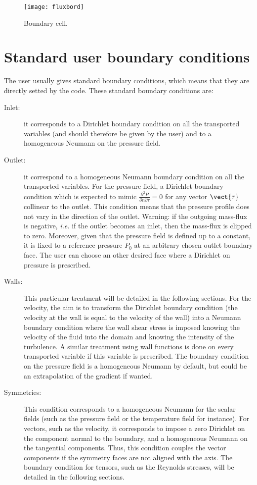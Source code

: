 \begin{figure}[!htpb]
\centering
\texttt{[image: fluxbord]}
\caption{Boundary cell.\label{fig:bndcnd:boundary_flux}}
\end{figure}

\section{Standard user boundary conditions}

The user usually gives standard boundary conditions, which means that 
they are directly setted by the code. These standard boundary conditions are:

\begin{description}
\item[Inlet:] it corresponds to a Dirichlet boundary condition on all the transported variables 
(and should therefore be given by the user) 
and to a homogeneous Neumann on the pressure field. 

\item[Outlet:] it correspond to a homogeneous Neumann boundary condition on all the transported variables.
For the pressure field, a Dirichlet boundary condition which is expected to mimic $\displaystyle\frac{\partial^2 P}{\partial n \partial \tau}=0$ for any vector  $\vect{\tau}$ collinear to the outlet. This condition means that the pressure
profile does not vary in the direction of the outlet. Warning: if the outgoing mass-flux is negative, 
\emph{i.e.} if the outlet becomes an inlet, then the mass-flux is clipped to zero. Moreover, given
that the pressure field is defined up to a constant, it is fixed to a reference pressure $P_0$
at an arbitrary chosen outlet boundary face. 
The user can choose an other desired face where a Dirichlet on pressure is prescribed.
 
\item[Walls:] This particular treatment will be detailed in the following sections. 
For the velocity, the aim is to transform the Dirichlet boundary condition (the velocity at the wall 
is equal to the velocity of the wall) into a Neumann boundary condition where the wall shear stress
is imposed knowing the velocity of the fluid into the domain and knowing the intensity of the turbulence. 
A similar treatment using wall functions is done on every transported variable if this variable is prescribed.
The boundary condition on the pressure field is a homogeneous Neumann by default, but could
be an extrapolation of the gradient if wanted.

\item[Symmetries:] This condition corresponds to a homogeneous Neumann for the scalar fields 
(such as the pressure field or the temperature field for instance). For vectors, such as the velocity, it corresponds
to impose a zero Dirichlet on the component normal to the boundary, and a homogeneous Neumann
on the tangential components. Thus, this condition couples the  vector components if the symmetry faces are not
aligned with the axis. The boundary condition for tensors, such as the Reynolds stresses, will be detailed in the following sections.
\end{description}

